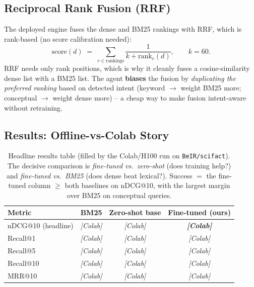 \documentclass[12pt,a4paper]{article}
\begin{document}
\subsection{Reciprocal Rank Fusion (RRF)}

The deployed engine fuses the dense and BM25 rankings with RRF, which is rank-based (no score calibration needed):
\[
\text{score}(d) \;=\; \sum_{r \in \text{rankings}} \frac{1}{k + \text{rank}_r(d)}, \qquad k = 60 .
\]
RRF needs only rank positions, which is why it cleanly fuses a cosine-similarity dense list with a BM25 list. The agent \textbf{biases} the fusion by \emph{duplicating the preferred ranking} based on detected intent (keyword $\rightarrow$ weight BM25 more; conceptual $\rightarrow$ weight dense more) -- a cheap way to make fusion intent-aware without retraining.

\subsection{Results: Offline-vs-Colab Story}

\begin{table}[H]
\centering
\caption{Headline results table (filled by the Colab/H100 run on \texttt{BeIR/scifact}). The decisive comparison is \emph{fine-tuned vs.\ zero-shot} (does training help?) and \emph{fine-tuned vs.\ BM25} (does dense beat lexical?). Success $=$ the fine-tuned column $\geq$ both baselines on nDCG@10, with the largest margin over BM25 on conceptual queries.}
\begin{tabular}{lccc}
\toprule
\textbf{Metric} & \textbf{BM25} & \textbf{Zero-shot base} & \textbf{Fine-tuned (ours)} \\
\midrule
nDCG@10 (headline) & \textit{[Colab]} & \textit{[Colab]} & \textbf{\textit{[Colab]}} \\
Recall@1 & \textit{[Colab]} & \textit{[Colab]} & \textit{[Colab]} \\
Recall@5 & \textit{[Colab]} & \textit{[Colab]} & \textit{[Colab]} \\
Recall@10 & \textit{[Colab]} & \textit{[Colab]} & \textit{[Colab]} \\
MRR@10 & \textit{[Colab]} & \textit{[Colab]} & \textit{[Colab]} \\
\bottomrule
\end{tabular}
\end{table}
\end{document}
